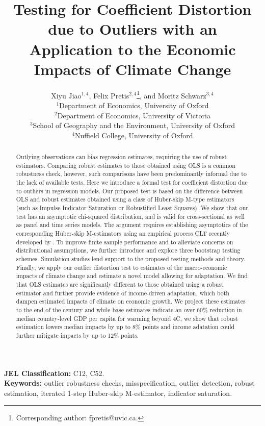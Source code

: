 \documentclass[11pt, letterpaper]{article}
\title{\textbf{Testing for Coefficient Distortion due to Outliers with an Application to the Economic Impacts of Climate Change}}
\author{Xiyu Jiao$^{1, 4}$, Felix Pretis$^{2, 4}$\thanks{Corresponding author: fpretis@uvic.ca.}, and Moritz Schwarz$^{3, 4}$
\vspace{0.5cm} \\
{\small $^1$Department of Economics, University of Oxford} \\
{\small $^2$Department of Economics, University of Victoria} \\
{\small $^3$School of Geography and the Environment, University of Oxford} \\
{\small $^4$Nuffield College, University of Oxford} \\
\vspace{-1cm}
}
\date{}
\numberwithin{algorithm}{section}
\numberwithin{assumption}{section}
\numberwithin{lemma}{section}
\numberwithin{theorem}{section}
\numberwithin{corollary}{section}
\numberwithin{remark}{section}
\numberwithin{equation}{section}
\numberwithin{figure}{section}
\numberwithin{table}{section}
\newcommand{\ignore}[1]{}
\begin{document}
\maketitle

\begin{abstract}
Outlying observations can bias regression estimates, requiring the use of robust estimators. Comparing robust estimates to those obtained using OLS is a common robustness check, however, such  comparisons have been predominantly informal due to the lack of available tests. Here we introduce a formal test for coefficient distortion due to outliers in regression models. Our proposed test is based on the difference between OLS and robust estimates obtained using a class of Huber-skip M-type estimators (such as Impulse Indicator Saturation or Robustified Least Squares). We show that our test has an asymptotic chi-squared distribution, and is valid for cross-sectional as well as panel and time series models. The argument requires establishing asymptotics of the corresponding Huber-skip M-estimators using an empirical process CLT recently developed by \cite{berenguer2019analysis}. To improve finite sample performance and to alleviate concerns on distributional assumptions, we further introduce and explore three bootstrap testing schemes. Simulation studies lend support to the proposed testing methods and theory. Finally, we apply our outlier distortion test to estimates of the macro-economic impacts of climate change and estimate a novel model allowing for adaptation. We find that OLS estimates are significantly different to those obtained using a robust estimator and further provide evidence of income-driven adaptation, which both dampen estimated impacts of climate on economic growth. We project these estimates to the end of the century and while base estimates indicate an over 60\% reduction in median country-level GDP per capita for warming beyond 4\textdegree C, we show that robust estimation lowers median impacts by up to 8\% points and income adatation could further mitigate impacts by up to 12\% points. \ignore{@Felix, a sentence on the wider signficance of robust estimation?}
\end{abstract}

\noindent \textbf{JEL Classification:} C12, C52. \\
\textbf{Keywords:} outlier robustness checks, misspecification, outlier detection, robust estimation, iterated 1-step Huber-skip M-estimator, indicator saturation.

\end{document}

